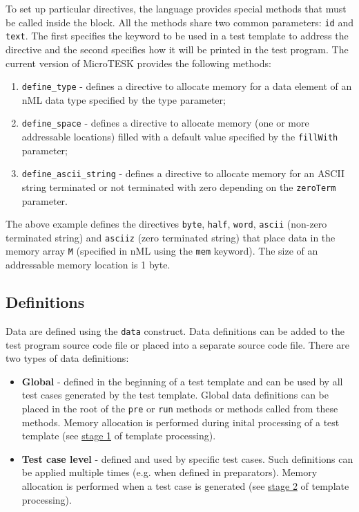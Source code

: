 \documentclass[oneside,final,12pt]{extreport}
\begin{document}
To set up particular directives, the language provides special methods that must
be called inside the block. All the methods share two common parameters:
\texttt{id} and \texttt{text}. The first specifies the keyword to be used in a
test template to address the directive and the second specifies how it will be
printed in the test program. The current version of MicroTESK provides the following methods:

\begin{enumerate}
  \item \texttt{define{\_}type} - defines a directive to allocate memory for a data element
        of an nML data type specified by the type parameter;

  \label{define_space}
  \item \texttt{define{\_}space} - defines a directive to allocate memory (one or more
        addressable locations) filled with a default value specified by the
        \texttt{fillWith} parameter;

  \item \texttt{define{\_}ascii{\_}string} - defines a directive to allocate memory for an
        ASCII string terminated or not terminated with zero depending on the
        \texttt{zeroTerm} parameter.
\end{enumerate}

The above example defines the directives \texttt{byte}, \texttt{half}, \texttt{word},
\texttt{ascii} (non-zero terminated string) and \texttt{asciiz} (zero terminated string)
that place data in the memory array \texttt{M} (specified in nML using the \texttt{mem} keyword).
The size of an addressable memory location is 1 byte.

\subsection{Definitions}

Data are defined using the \texttt{data} construct. Data definitions can be added to the test
program source code file or placed into a separate source code file. There are two types of
data definitions:

\begin{itemize}
\item \textbf{Global} - defined in the beginning of a test template and can be used by
      all test cases generated by the test template. Global data definitions can be placed in
      the root of the \texttt{pre} or \texttt{run} methods or methods called from these methods.
      Memory allocation is performed during inital processing of a test template (see
      \hyperref[ttp_stage_1]{stage 1} of template processing).

\item \textbf{Test case level} - defined and used by specific test cases. Such definitions
      can be applied multiple times (e.g. when defined in preparators).
      Memory allocation is performed when a test case is generated (see
      \hyperref[ttp_stage_2]{stage 2} of template processing).
\end{itemize}
\end{document}
